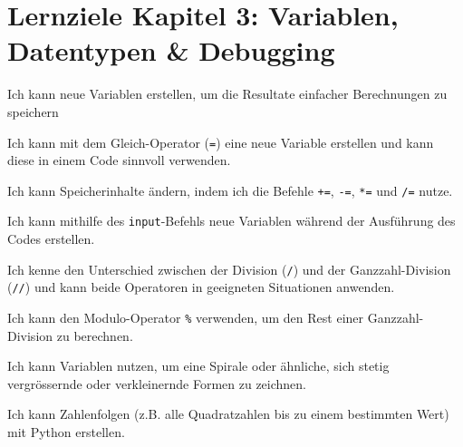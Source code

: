 \section{Lernziele Kapitel 3: Variablen, Datentypen \& Debugging}
\begin{todolist}
    \item Ich kann neue Variablen erstellen, um die Resultate einfacher Berechnungen zu speichern
    \item Ich kann mit dem Gleich-Operator (\lstinline|=|) eine neue Variable erstellen und kann diese in einem Code sinnvoll verwenden.
    \item Ich kann Speicherinhalte ändern, indem ich die Befehle \lstinline|+=|, \lstinline|-=|, \lstinline|*=| und \lstinline|/=| nutze.
    \item Ich kann mithilfe des \lstinline|input|-Befehls neue Variablen während der Ausführung des Codes erstellen.
    \item Ich kenne den Unterschied zwischen der Division (\lstinline|/|) und der Ganzzahl-Division (\lstinline|//|) und kann beide Operatoren in geeigneten Situationen anwenden.
    \item Ich kann den Modulo-Operator \lstinline|%| verwenden, um den Rest einer Ganzzahl-Division zu berechnen.
    \item Ich kann Variablen nutzen, um eine Spirale oder ähnliche, sich stetig vergrössernde oder verkleinernde Formen zu zeichnen.
    \item Ich kann Zahlenfolgen (z.B. alle Quadratzahlen bis zu einem bestimmten Wert) mit Python erstellen.
\end{todolist}

